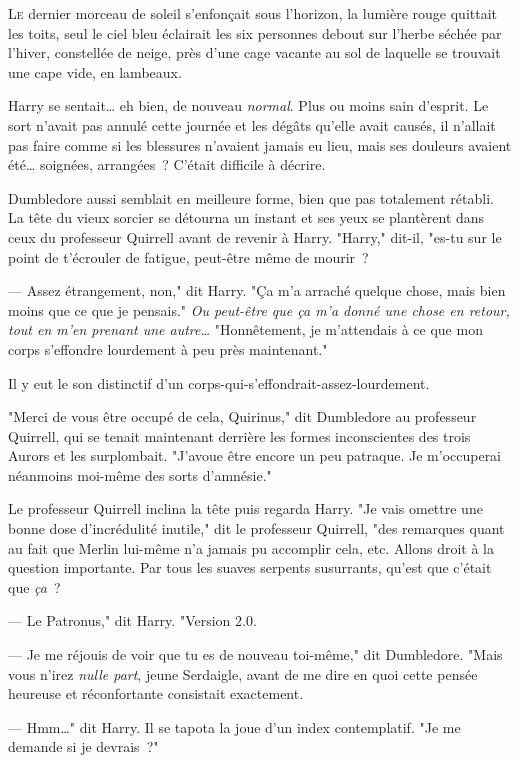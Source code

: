 
\lettrine{L}{e} dernier morceau de soleil s'enfonçait sous l'horizon, la lumière rouge quittait les toits, seul le ciel bleu éclairait les six personnes debout sur l'herbe séchée par l'hiver, constellée de neige, près d'une cage vacante au sol de laquelle se trouvait une cape vide, en lambeaux.

Harry se sentait… eh bien, de nouveau \emph{normal}. Plus ou moins sain d'esprit. Le sort n'avait pas annulé cette journée et les dégâts qu'elle avait causés, il n'allait pas faire comme si les blessures n'avaient jamais eu lieu, mais ses douleurs avaient été… soignées, arrangées~? C'était difficile à décrire.

Dumbledore aussi semblait en meilleure forme, bien que pas totalement rétabli. La tête du vieux sorcier se détourna un instant et ses yeux se plantèrent dans ceux du professeur Quirrell avant de revenir à Harry. "Harry," dit-il, "es-tu sur le point de t'écrouler de fatigue, peut-être même de mourir~?

--- Assez étrangement, non," dit Harry. "Ça m'a arraché quelque chose, mais bien moins que ce que je pensais." \emph{Ou peut-être que ça m'a donné une chose en retour, tout en m'en prenant une autre…} "Honnêtement, je m'attendais à ce que mon corps s'effondre lourdement à peu près maintenant."

Il y eut le son distinctif d'un corps-qui-s'effondrait-assez-lourdement.

"Merci de vous être occupé de cela, Quirinus," dit Dumbledore au professeur Quirrell, qui se tenait maintenant derrière les formes inconscientes des trois Aurors et les surplombait. "J'avoue être encore un peu patraque. Je m'occuperai néanmoins moi-même des sorts d'amnésie."

Le professeur Quirrell inclina la tête puis regarda Harry. "Je vais omettre une bonne dose d'incrédulité inutile," dit le professeur Quirrell, "des remarques quant au fait que Merlin lui-même n'a jamais pu accomplir cela, etc. Allons droit à la question importante. Par tous les suaves serpents susurrants, qu'est que c'était que \emph{ça}~?

--- Le Patronus," dit Harry. "Version 2.0.

--- Je me réjouis de voir que tu es de nouveau toi-même," dit Dumbledore. "Mais vous n'irez \emph{nulle part}, jeune Serdaigle, avant de me dire en quoi cette pensée heureuse et réconfortante consistait exactement.

--- Hmm…" dit Harry. Il se tapota la joue d'un index contemplatif. "Je me demande si je devrais~?"

